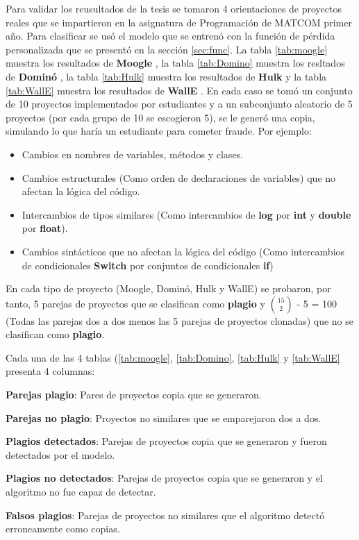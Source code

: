Para validar los reusultados de la tesis se tomaron 4 orientaciones de proyectos reales que se impartieron en la asignatura de Programación de MATCOM primer año. Para clasificar se usó el modelo que se entrenó con la función de pérdida personalizada que se presentó en la sección \ref{sec:func}. La tabla \ref{tab:moogle} muestra los resultados de \textbf{Moogle} \cite{MoogleGitHub}, la tabla \ref{tab:Domino} muestra los resltados de \textbf{Dominó} \cite{DominoGitHub}, la tabla \ref{tab:Hulk} muestra los resultados de \textbf{Hulk} \cite{HulkGitHub} y la tabla \ref{tab:WallE} muestra los resultados de \textbf{WallE} \cite{CoolCompilerBase2019}. En cada caso se tomó un conjunto de 10 proyectos implementados por estudiantes y a un subconjunto aleatorio de 5 proyectos (por cada grupo de 10 se escogieron 5), se le generó una copia, simulando lo que haría un estudiante para cometer fraude. Por ejemplo: 

\begin{itemize}
\item Cambios en nombres de variables, métodos y clases.
\item Cambios estructurales (Como orden de declaraciones de variables) que no afectan la lógica del código.
\item Intercambios de tipos similares (Como intercambios de \textbf{log} por \textbf{int} y \textbf{double} por \textbf{float}).
\item Cambios sintácticos que no afectan la lógica del código (Como intercambios de condicionales \textbf{Switch} por conjuntos de condicionales \textbf{if})
\end{itemize}

En cada tipo de proyecto (Moogle, Dominó, Hulk y WallE) se probaron, por tanto, 5 parejas de proyectos que se clasifican como \textbf{plagio} y ${15}\choose{2}$ - 5 = 100 (Todas las parejas dos a dos menos las 5 parejas de proyectos clonadas) que no se clasifican como \textbf{plagio}. 

Cada una de las 4 tablas (\ref{tab:moogle}, \ref{tab:Domino}, \ref{tab:Hulk} y \ref{tab:WallE} presenta 4 columnas:

\begin{enumerate}

\end{enumerate}
\item \textbf{Parejas plagio}: Pares de proyectos copia que se generaron.
\item \textbf{Parejas no plagio}: Proyectos no similares que se emparejaron dos a dos.
\item \textbf{Plagios detectados}: Parejas de proyectos copia que se generaron y fueron detectados por el modelo.
\item \textbf{Plagios no detectados}: Parejas de proyectos copia que se generaron y el algoritmo no fue capaz de detectar.
\item \textbf{Falsos plagios}: Parejas de proyectos no similares que el algoritmo detectó erroneamente como copias.

